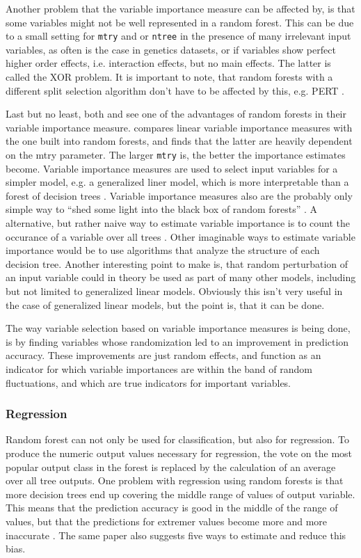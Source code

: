 \documentclass[a4paper,man,12pt,apacite,floatsintext,draftfirst]{apa6} %
\begin{document}
Another problem that the variable importance measure can be affected by,
is that some variables might not be well represented in a random forest.
This can be due to a small setting for \texttt{mtry} and or \texttt{ntree}
in the presence of many irrelevant input variables, as often is the case
in genetics datasets, or if variables show perfect higher order effects,
i.e. interaction effects, but no main effects.
The latter is called the XOR problem.
It is important to note, that random forests with a different split selection
algorithm don't have to be affected by this, e.g. PERT \cite{cutler2001pert}.

Last but no least, both \cite{strobl2009introduction} and
\cite{gromping2009variable} see one of the advantages of random forests in
their variable importance measure.
\cite{gromping2009variable} compares linear variable importance measures
with the one built into random forests, and finds that the latter are
heavily dependent on the mtry parameter.
The larger \texttt{mtry} is, the better the importance estimates become.
Variable importance measures are used to select input variables for a simpler
model, e.g. a generalized liner model, which is more interpretable than a
forest of decision trees \cite{strobl2009introduction}.
Variable importance measures also are the probably only simple way to
“shed some light into the black box of random forests”
\cite{gromping2009variable}.
A alternative, but rather naive way to estimate variable importance is to count
the occurance of a variable over all trees \cite{strobl2009introduction}.
Other imaginable ways to estimate variable importance would be to use
algorithms that analyze the structure of each decision tree.
Another interesting point to make is, that random perturbation of an input
variable could in theory be used as part of many other models, including but
not limited to generalized linear models.
Obviously this isn't very useful in the case of generalized linear models, but
the point is, that it can be done.

The way variable selection based on variable importance measures is
being done, is by finding variables whose randomization led to an improvement
in prediction accuracy.
These improvements are just random effects, and function as an indicator
for which variable importances are within the band of random fluctuations,
and which are true indicators for important variables.

\subsubsection{Regression}
Random forest can not only be used for classification, but also for regression.
To produce the numeric output values necessary for regression,
the vote on the most popular output class in the forest is replaced by the
calculation of an average over all tree outputs.
One problem with regression using random forests is that more decision trees
end up covering the middle range of values of output variable.
This means that the prediction accuracy is good in the middle of the range
of values, but that the predictions for extremer values become more and more
inaccurate \cite{zhang2012bias}.
The same paper also suggests five ways to estimate and reduce this bias.
\end{document}
